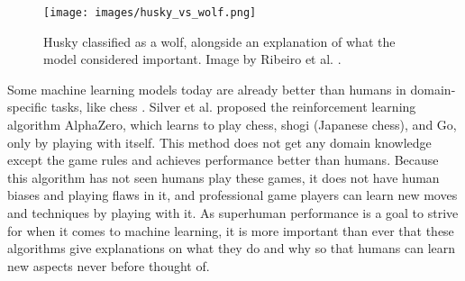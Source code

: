 \begin{figure}[htb]
    \centering
    \texttt{[image: images/husky\_vs\_wolf.png]}
    \caption[Husky classified as a wolf, alongside an explanation of what the model considered important.]{Husky classified as a wolf, alongside an explanation of what the model considered important. Image by Ribeiro et al. \cite{ribeiroWhyShouldTrust2016}.}
    \label{fig:wolf_husky}
\end{figure} 


Some machine learning models today are already better than humans in domain-specific tasks, like chess \cite{campbellDeepBlue2002}. Silver et al. \cite{silverGeneralReinforcementLearning2018} proposed the reinforcement learning algorithm AlphaZero, which learns to play chess, shogi (Japanese chess), and Go, only by playing with itself. This method does not get any domain knowledge except the game rules and achieves performance better than humans. Because this algorithm has not seen humans play these games, it does not have human biases and playing flaws in it, and professional game players can learn new moves and techniques by playing with it. 
As superhuman performance is a goal to strive for when it comes to machine learning, it is more important than ever that these algorithms give explanations on what they do and why so that humans can learn new aspects never before thought of.
